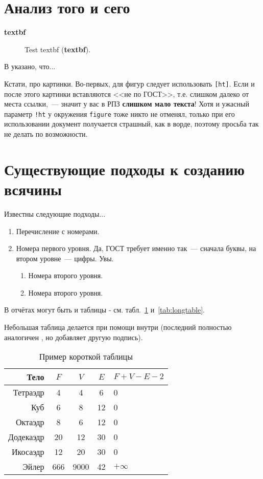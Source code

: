 \documentclass[utf8]{G7-32} %
\begin{document}
\section{Анализ того и сего}

\textbf{textbf}

\begin{figure}
\centering
\caption{Test textbf (\textbf{textbf}).}
\label{fig:dia}
\end{figure}


В \cite{Pup99} указано, что...

Кстати, про картинки. Во-первых, для фигур следует использовать \texttt{[ht]}. Если и после этого картинки вставляются <<не по ГОСТ>>, т.е. слишком далеко от места ссылки,~--- значит у вас в РПЗ \textbf{слишком мало текста}! Хотя и ужасный параметр \texttt{!ht} у окружения \texttt{figure} тоже никто не отменял, только при его использовании документ получается страшный, как в ворде, поэтому просьба так не делать по возможности.


\section{Существующие подходы к созданию всячины}

Известны следующие подходы...

\begin{enumerate}
\item Перечисление с номерами.
\item Номера первого уровня. Да, ГОСТ требует именно так~--- сначала буквы, на втором уровне~--- цифры. Увы.
\begin{enumerate} 
\item Номера второго уровня.
\item Номера второго уровня.
\end{enumerate}
\end{enumerate}

В отчётах могут быть и таблицы - см. табл.~\ref{tab:tabular} и~\ref{tab:longtable}.

Небольшая таблица делается при помощи  внутри  (последний
полностью аналогичен , но добавляет другую подпись).

\begin{table}[ht]
  \centering
  \begin{tabular}{|r|c|c|c|l|}
  \hline
  Тело      & $F$ & $V$  & $E$ & $F+V-E-2$ \\
  \hline                       
  Тетраэдр  & 4   & 4    & 6   & 0         \\ 
  Куб       & 6   & 8    & 12  & 0         \\ 
  Октаэдр   & 8   & 6    & 12  & 0         \\ 
  Додекаэдр & 20  & 12   & 30  & 0         \\ 
  Икосаэдр  & 12  & 20   & 30  & 0         \\ 
  \hline
  Эйлер     & 666 & 9000 & 42  & $+\infty$ \\
  \hline
  \end{tabular}      
  \caption{Пример короткой таблицы}
  \label{tab:tabular}
\end{table}
\end{document}
